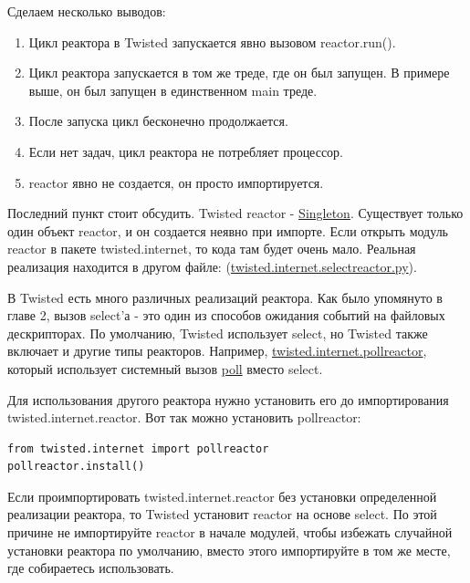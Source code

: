 Сделаем несколько выводов:

\begin{enumerate}
\item Цикл реактора в Twisted запускается явно вызовом reactor.run().

\item Цикл реактора запускается в том же треде, где он 
был запущен. В примере выше, он был запущен в единственном main треде. 

\item После запуска цикл бесконечно продолжается.

\item Если нет задач, цикл реактора не потребляет процессор.

\item reactor явно не создается, он просто импортируется.
\end{enumerate}


Последний пункт стоит обсудить. Twisted reactor -  
\href{http://en.wikipedia.org/wiki/Singleton\_pattern}{Singleton}. 
Существует только один объект reactor, и он создается неявно при импорте. 
Если открыть модуль reactor в пакете twisted.internet, то кода там будет 
очень мало. Реальная реализация находится в другом файле:
\newline (\href{http://twistedmatrix.com/trac/browser/tags/releases/twisted-8.2.0/twisted/internet/selectreactor.py}{twisted.internet.selectreactor.py}).


В Twisted есть много различных реализаций реактора. Как было упомянуто 
в главе 2, вызов select'а - это один из способов ожидания событий на 
файловых дескрипторах. По умолчанию, Twisted использует select, 
но Twisted также включает и другие типы реакторов. Например, 
\href{http://twistedmatrix.com/trac/browser/tags/releases/twisted-8.2.0/twisted/internet/pollreactor.py}{twisted.internet.pollreactor}, который использует системный вызов 
\href{http://www.makelinux.net/ldd3/chp-6-sect-3.shtml}{poll} вместо 
select.


Для использования другого реактора нужно установить его до 
импортирования twisted.internet.reactor. Вот так можно 
установить pollreactor:

\begin{scriptsize}\begin{verbatim}
from twisted.internet import pollreactor
pollreactor.install()
\end{verbatim}\end{scriptsize}


Если проимпортировать twisted.internet.reactor без 
установки определенной реализации реактора, то 
Twisted установит reactor на основе select. 
По этой причине не импортируйте reactor в начале 
модулей, чтобы избежать случайной установки 
реактора по умолчанию, вместо этого импортируйте 
в том же месте, где собираетесь использовать.


